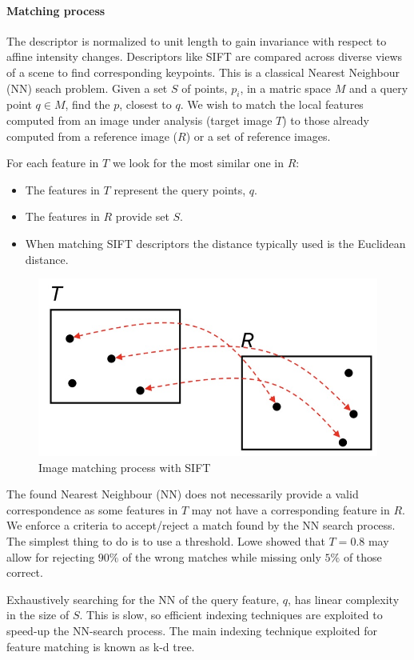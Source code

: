 \documentclass{article}
\begin{document}
\paragraph{Matching process}
The descriptor is normalized to unit length to gain invariance with respect to affine intensity changes.
Descriptors like SIFT are compared across diverse views of a scene to find corresponding keypoints.
This is a classical Nearest Neighbour (NN) seach problem.
Given a set $S$ of points, $p_i$, in a matric space $M$ and a query point $q \in M$, find the $p$, closest to $q$.
We wish to match the local features computed from an image under analysis (target image $T$) to those already computed from a reference image ($R$) or a set of reference images.

For each feature in $T$ we look for the most similar one in $R$:
\begin{itemize}
  \item The features in $T$ represent the query points, $q$.
  \item The features in $R$ provide set $S$.
  \item When matching SIFT descriptors the distance typically used is the Euclidean distance.
\end{itemize}

\begin{figure}[htbp]
  \centering
  \includegraphics[width=0.5\linewidth]{./img/matching_sift.jpg}
  \caption{Image matching process with SIFT}
  \label{fig:matching_sift}
\end{figure}

The found Nearest Neighbour (NN) does not necessarily provide a valid correspondence as some features in $T$ may not have a corresponding feature in $R$.
We enforce a criteria to accept/reject a match found by the NN search process.
The simplest thing to do is to use a threshold.
Lowe showed that $T=0.8$ may allow for rejecting $90\%$ of the wrong matches while missing only $5\%$ of those correct.

Exhaustively searching for the NN of the query feature, $q$, has linear complexity in the size of $S$.
This is slow, so efficient indexing techniques are exploited to speed-up the NN-search process.
The main indexing technique exploited for feature matching is known as k-d tree.
\end{document}
